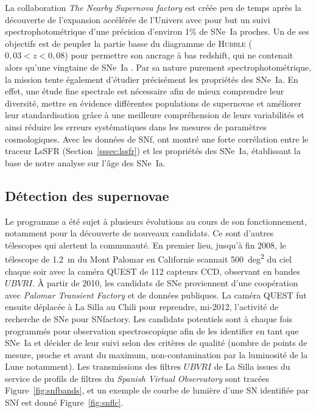 \documentclass[../main/main.tex]{subfiles}
\begin{document}
La collaboration \textit{The Nearby Supernova factory}
\citep[SNfactory,][]{aldering2002} est créée peu de temps après la découverte de
l'expansion accélérée de l'Univers \citep{riess1998, perlmutter1999} avec pour
but un suivi spectrophotométrique d'une précision d'environ 1\% de SNe~Ia
proches. Un de ses objectifs est de peupler la partie basse du diagramme de
\textsc{Hubble} ($0,03 < z < 0,08$) pour permettre son ancrage à bas redshift,
qui ne contenait alors qu'une vingtaine de SNe~Ia \citep{hamuy1996}. Par sa
nature purement spectrophotométrique, la mission tente également d'étudier
précisément les propriétés des SNe~Ia. En effet, une étude fine spectrale est
nécessaire afin de mieux comprendre leur diversité, mettre en évidence
différentes populations de supernovae et améliorer leur standardisation grâce à
une meilleure compréhension de leurs variabilités et ainsi réduire les erreurs
systématiques dans les mesures de paramètres cosmologiques. Avec les données de
SNf, \cite{rigault2020} ont montré une forte corrélation entre le traceur LsSFR
(Section~\ref{sssec:lssfr}) et les propriétés des SNe~Ia, établissant la base de
notre analyse sur l'âge des SNe~Ia.

\subsection{Détection des supernovae}\label{ssec:snfdetec}

Le programme a été sujet à plusieurs évolutions au cours de son fonctionnement,
notamment pour la découverte de nouveaux candidats. Ce sont d'autres télescopes
qui alertent la communauté. En premier lieu, jusqu'à fin 2008, le télescope de
\SI{1,2}{m} du Mont Palomar en Californie \citep{rabinowitz2003} scannait
\SI{500}{deg^2} du ciel chaque soir avec la caméra QUEST de 112 capteurs CCD,
observant en bandes $UBVRI$. À partir de 2010, les candidats de SNe proviennent
d'une coopération avec \textit{Palomar Transient Factory}
\citep[PTF,][]{law2009} et de données publiques. La caméra QUEST fut ensuite
déplacée à La Silla au Chili \citep[LSQ,][]{hadjiyska2012} pour reprendre,
mi-2012, l'activité de recherche de SNe pour SNfactory. Les candidats potentiels
sont à chaque fois programmés pour observation spectroscopique afin de les
identifier en tant que SNe~Ia et décider de leur suivi selon des critères de
qualité (nombre de points de mesure, proche et avant du maximum,
non-contamination par la luminosité de la Lune notamment). Les transmissions des
filtres $UBVRI$ de La Silla issues du service de profils de filtres du
\textit{Spanish Virtual Observatory} \citep[SVO\footnote{
    \href{http://svo2.cab.inta-csic.es/theory/fps/index.php?asttype=astro}
{http://svo2.cab.inta-csic.es/theory/fps/index.php?asttype=astro}},][]
{rodrigo2020} sont tracées Figure~\ref{fig:snfbands}, et un exemple de courbe de
lumière d'une SN identifiée par SNf est donné Figure~\ref{fig:snflc}.
\end{document}
